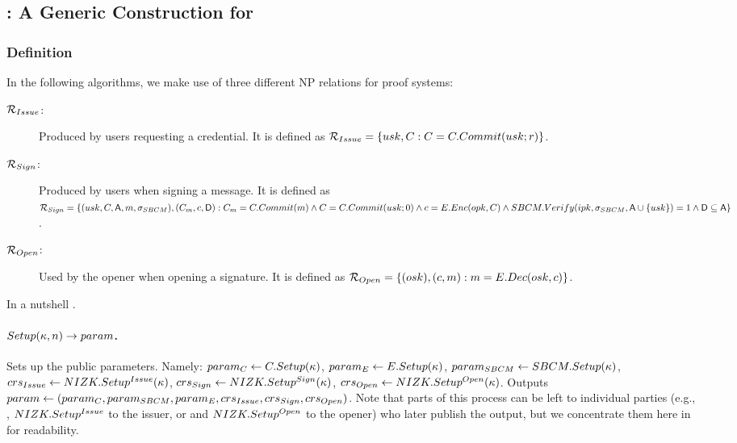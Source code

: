 \subsection{\GSACGen: A Generic Construction for \GSAC}
\label{ssec:generic-gsac}


\subsubsection{Definition}
\label{sssec:generic-gsac-definition}

In the following algorithms, we make use of three different NP relations for
\NIZK proof systems:

\begin{description}
\item[$\mathcal{R}_{Issue}$:] Produced by users requesting a credential. It is
  defined as $\mathcal{R}_{Issue} = \lbrace usk, C :
  C = C.Commit(usk; r) \rbrace$.
\item[$\mathcal{R}_{Sign}$:] Produced by users when signing a message. It is
  defined as $\mathcal{R}_{Sign} = \lbrace (usk,C,\mathsf{A},m,\sigma_{SBCM}),
  (C_{m},c,\mathsf{D}) : C_{m} = C.Commit(m) \land C =
  C.Commit(usk; 0) \land c = E.Enc(opk,C)
  \land SBCM.Verify(ipk,\sigma_{SBCM},\mathsf{A} \cup \lbrace usk \rbrace) = 1
  \land \mathsf{D} \subseteq \mathsf{A} \rbrace$.
\item[$\mathcal{R}_{Open}$:] Used by the opener when opening a signature. It
  is defined as $\mathcal{R}_{Open} = \lbrace (osk), (c,m) :
  m = E.Dec(osk,c) \rbrace$.
\end{description}

In a nutshell .

\paragraph{$Setup(\kappa,n) \rightarrow param$.} %
Sets up the public parameters. Namely: $param_C \gets C.Setup(\kappa)$, $param_{E}
\gets E.Setup(\kappa)$, $param_{SBCM} \gets SBCM.Setup(\kappa)$,
$crs_{Issue} \gets NIZK.Setup^{Issue}(\kappa)$, $crs_{Sign} \gets
NIZK.Setup^{Sign} (\kappa)$, $crs_{Open}\gets NIZK.Setup^{Open}(\kappa)$.
Outputs $param \gets (param_C,param_{SBCM},param_{E},crs_{Issue},crs_{Sign},
crs_{Open})$. Note that parts of this process can be left to individual
parties (e.g., \SBCMSetup, $NIZK.Setup^{Issue}$ to the issuer, or \ESetup and
$NIZK.Setup^{Open}$ to the opener) who later publish the output, but we
concentrate them here in \Setup for readability.


